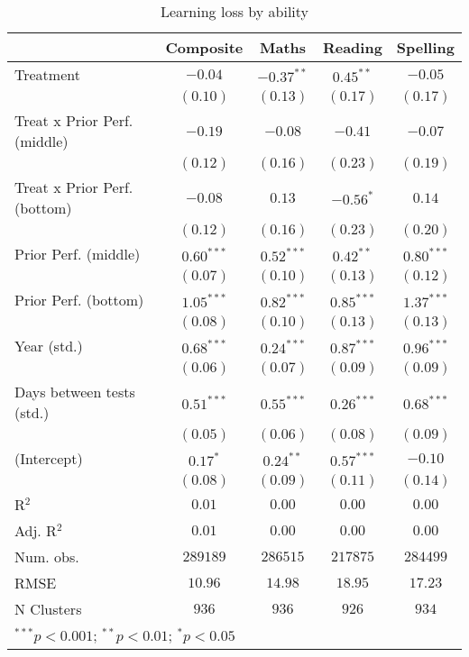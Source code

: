 
\begin{table}
\begin{center}
\begin{tabular}{l c c c c}
\hline
 & Composite & Maths & Reading & Spelling \\
\hline
Treatment                    & $-0.04$      & $-0.37^{**}$ & $0.45^{**}$  & $-0.05$      \\
                             & $(0.10)$     & $(0.13)$     & $(0.17)$     & $(0.17)$     \\
Treat x Prior Perf. (middle) & $-0.19$      & $-0.08$      & $-0.41$      & $-0.07$      \\
                             & $(0.12)$     & $(0.16)$     & $(0.23)$     & $(0.19)$     \\
Treat x Prior Perf. (bottom) & $-0.08$      & $0.13$       & $-0.56^{*}$  & $0.14$       \\
                             & $(0.12)$     & $(0.16)$     & $(0.23)$     & $(0.20)$     \\
Prior Perf. (middle)         & $0.60^{***}$ & $0.52^{***}$ & $0.42^{**}$  & $0.80^{***}$ \\
                             & $(0.07)$     & $(0.10)$     & $(0.13)$     & $(0.12)$     \\
Prior Perf. (bottom)         & $1.05^{***}$ & $0.82^{***}$ & $0.85^{***}$ & $1.37^{***}$ \\
                             & $(0.08)$     & $(0.10)$     & $(0.13)$     & $(0.13)$     \\
Year (std.)                  & $0.68^{***}$ & $0.24^{***}$ & $0.87^{***}$ & $0.96^{***}$ \\
                             & $(0.06)$     & $(0.07)$     & $(0.09)$     & $(0.09)$     \\
Days between tests (std.)    & $0.51^{***}$ & $0.55^{***}$ & $0.26^{***}$ & $0.68^{***}$ \\
                             & $(0.05)$     & $(0.06)$     & $(0.08)$     & $(0.09)$     \\
(Intercept)                  & $0.17^{*}$   & $0.24^{**}$  & $0.57^{***}$ & $-0.10$      \\
                             & $(0.08)$     & $(0.09)$     & $(0.11)$     & $(0.14)$     \\
\hline
R$^2$                        & $0.01$       & $0.00$       & $0.00$       & $0.00$       \\
Adj. R$^2$                   & $0.01$       & $0.00$       & $0.00$       & $0.00$       \\
Num. obs.                    & $289189$     & $286515$     & $217875$     & $284499$     \\
RMSE                         & $10.96$      & $14.98$      & $18.95$      & $17.23$      \\
N Clusters                   & $936$        & $936$        & $926$        & $934$        \\
\hline
\multicolumn{5}{l}{\scriptsize{$^{***}p<0.001$; $^{**}p<0.01$; $^{*}p<0.05$}}
\end{tabular}
\caption{Learning loss by ability}
\label{tableability}
\end{center}
\end{table}

